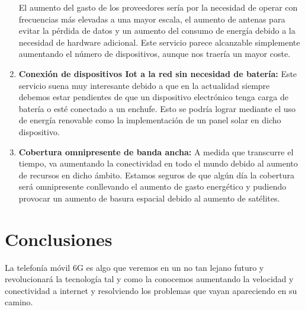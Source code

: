 \begin{enumerate}
El aumento del gasto de los proveedores sería por la necesidad de operar con frecuencias más elevadas a una mayor escala, el aumento de antenas para evitar la pérdida de datos y un aumento del consumo de energía debido a la necesidad de hardware adicional. Este servicio parece alcanzable simplemente aumentando el número de dispositivos, aunque nos traería un mayor coste.
\item {\bfseries Conexión de dispositivos Iot a la red sin necesidad de batería:  }
Este servicio suena muy interesante debido a que en la actualidad siempre debemos estar pendientes de que un dispositivo electrónico tenga carga de batería o esté conectado a un enchufe. Esto se podría lograr mediante el uso de energía renovable como la implementación de un panel solar en dicho dispositivo.
\item {\bfseries Cobertura omnipresente de banda ancha:  }
A medida que transcurre el tiempo, va aumentando la conectividad en todo el mundo debido al aumento de recursos en dicho ámbito. Estamos seguros de que algún día la cobertura será omnipresente conllevando el aumento de gasto energético y pudiendo provocar un aumento de basura espacial debido al aumento de satélites.
\end{enumerate}

\section{Conclusiones}
\label{sec:conclusiones}
La telefonía móvil 6G es algo que veremos en un no tan lejano futuro y revolucionará la tecnología tal y como la conocemos aumentando la velocidad y conectividad a internet y resolviendo los problemas que vayan apareciendo en su camino.\nocite{6G}

          






